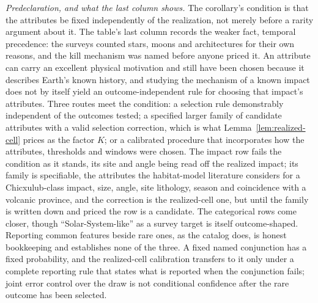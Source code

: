 \noindent\textit{Predeclaration, and what the last column shows.} The corollary's condition is that the attributes be fixed independently of the realization, not merely before a rarity argument about it. The table's last column records the weaker fact, temporal precedence: the surveys counted stars, moons and architectures for their own reasons, and the kill mechanism was named before anyone priced it. An attribute can carry an excellent physical motivation and still have been chosen because it describes Earth's known history, and studying the mechanism of a known impact does not by itself yield an outcome-independent rule for choosing that impact's attributes. Three routes meet the condition: a selection rule demonstrably independent of the outcomes tested; a specified larger family of candidate attributes with a valid selection correction, which is what Lemma~\ref{lem:realized-cell} prices as the factor $K$; or a calibrated procedure that incorporates how the attributes, thresholds and windows were chosen. The impact row fails the condition as it stands, its site and angle being read off the realized impact; its family is specifiable, the attributes the habitat-model literature considers for a Chicxulub-class impact, size, angle, site lithology, season and coincidence with a volcanic province, and the correction is the realized-cell one, but until the family is written down and priced the row is a candidate. The categorical rows come closer, though ``Solar-System-like'' as a survey target is itself outcome-shaped. Reporting common features beside rare ones, as the catalog does, is honest bookkeeping and establishes none of the three. A fixed named conjunction has a fixed probability, and the realized-cell calibration transfers to it only under a complete reporting rule that states what is reported when the conjunction fails; joint error control over the draw is not conditional confidence after the rare outcome has been selected.

